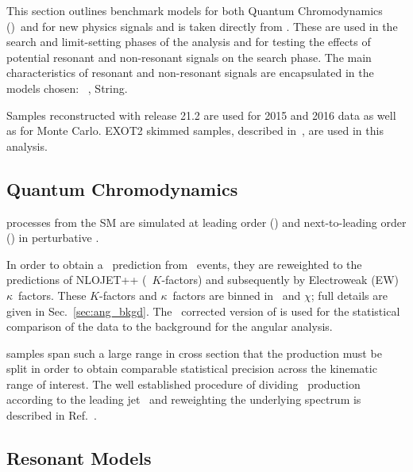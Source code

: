 This section outlines benchmark models for both Quantum Chromodynamics (\QCD)~and for new
physics signals and is taken directly from \cite{Bauce:2226443}. These are used in the search and limit-setting phases of the
analysis and for testing the effects of potential
resonant and non-resonant signals on the search phase.
The main characteristics of resonant and non-resonant
signals are encapsulated in the models chosen:
\Hprime\ , String.

Samples reconstructed with release 21.2 are used for 2015 and 2016 data as well as for Monte Carlo. EXOT2 skimmed samples, described in~\cite{ATLAS:Exot2Derivation}, are used in this analysis.

\subsection{Quantum Chromodynamics}
\label{qcdsamps}
\QCD processes from the SM are simulated at leading order (\LO)
and next-to-leading order (\NLO) in perturbative \QCD. 

In order to obtain a \NLO~prediction from \Pythia~events, they are reweighted to the 
predictions of NLOJET++ (\NLO~$K$-factors) and subsequently by Electroweak (EW) $\kappa$~factors. 
These $K$-factors and $\kappa$~factors are binned in \mjj\ and $\chi$; full details are given in Sec.~\ref{sec:ang_bkgd}.  The \NLO\ corrected
version of  is used for the statistical comparison of the 
data to the background for the angular analysis.

\QCD samples span such a large range in cross section that the
production must be split in order to obtain comparable statistical precision
across the kinematic range of interest.
The well established procedure of dividing \QCD~production according
to the leading jet \pT~and reweighting the underlying spectrum
is described in Ref.~\cite{Marshall:2016630}.  

\subsection{Resonant Models}
